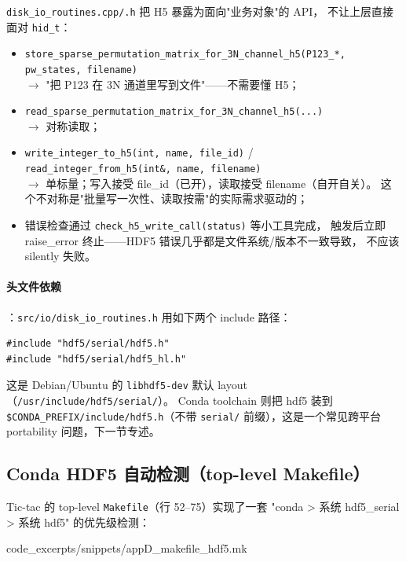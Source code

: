 \texttt{disk\_io\_routines.cpp/.h} 把 H5 暴露为面向"业务对象"的 API，
不让上层直接面对 \texttt{hid\_t}：

\begin{itemize}
\item \texttt{store\_sparse\_permutation\_matrix\_for\_3N\_channel\_h5(P123\_*, pw\_states, filename)}\\
      $\to$ "把 P123 在 3N 通道里写到文件"——不需要懂 H5；
\item \texttt{read\_sparse\_permutation\_matrix\_for\_3N\_channel\_h5(...)}\\
      $\to$ 对称读取；
\item \texttt{write\_integer\_to\_h5(int, name, file\_id)} / \texttt{read\_integer\_from\_h5(int\&, name, filename)}\\
      $\to$ 单标量；写入接受 file\_id（已开），读取接受 filename（自开自关）。
      这个不对称是"批量写一次性、读取按需"的实际需求驱动的；
\item 错误检查通过 \texttt{check\_h5\_write\_call(status)} 等小工具完成，
      触发后立即 raise\_error 终止——HDF5 错误几乎都是文件系统/版本不一致导致，
      不应该 silently 失败。
\end{itemize}

\paragraph{头文件依赖}：\texttt{src/io/disk\_io\_routines.h} 用如下两个 include
路径：
\begin{lstlisting}[style=cpp]
#include "hdf5/serial/hdf5.h"
#include "hdf5/serial/hdf5_hl.h"
\end{lstlisting}
这是 Debian/Ubuntu 的 \texttt{libhdf5-dev} 默认 layout（\texttt{/usr/include/hdf5/serial/}）。
Conda toolchain 则把 hdf5 装到 \texttt{\$CONDA\_PREFIX/include/hdf5.h}（不带
\texttt{serial/} 前缀），这是一个常见跨平台 portability 问题，下一节专述。

\subsection{Conda HDF5 自动检测（top-level Makefile）}
\label{sec:appD:conda_hdf5}

Tic-tac 的 top-level \texttt{Makefile}（行 52--75）实现了一套
"conda > 系统 hdf5\_serial > 系统 hdf5" 的优先级检测：


{code_excerpts/snippets/appD_makefile_hdf5.mk}

